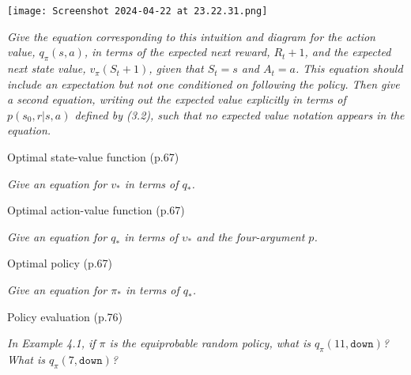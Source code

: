 \documentclass[12pt,letterpaper]{exam}
\newcommand{\chapter}{2}
\begin{document}
\begin{questions}
	\texttt{[image: Screenshot 2024-04-22 at 23.22.31.png]}%

	\emph{Give the equation corresponding to this intuition and diagram for the action value, \(q_\pi(s, a)\), 
	in terms of the expected next reward, \(R_t+1\), and the expected next state value, \(v_\pi(S_t+1)\), 
	given that \(S_t = s\) and \(A_t = a\). This equation should include an expectation but not one conditioned on following the policy. 
	Then give a second equation, writing out the expected value explicitly in terms of \(p(s_0,r|s, a)\) defined by (3.2), 
	such that no expected value notation appears in the equation.}
	\begin{solution}
	\end{solution}

	\setcounter{question}{25-1}%
	\question%
	Optimal state-value function (p.67)

	\emph{Give an equation for \(v_*\) in terms of \(q_*\).}
	\begin{solution}
	\end{solution}

	\question%
	Optimal action-value function (p.67)

	\emph{Give an equation for \(q_*\) in terms of \(\upsilon_*\) and the four-argument \(p\).}
	\begin{solution}
	\end{solution}

	\question%
	Optimal policy (p.67)

	\emph{Give an equation for \(\pi_*\) in terms of \(q_*\).}
	\begin{solution}
	\end{solution}

	\setcounter{section}{4}
	\renewcommand\chapter{4}
	\setcounter{question}{1-1}%
	\question%
	Policy evaluation (p.76)

	\emph{In Example 4.1, if \(\pi\) is the equiprobable random policy, what is \(q_\pi(11, \texttt{down})\)? 
	What is \(q_\pi(7, \texttt{down})\)?}
	\begin{solution}
	\end{solution}


\end{questions}
\end{document}
